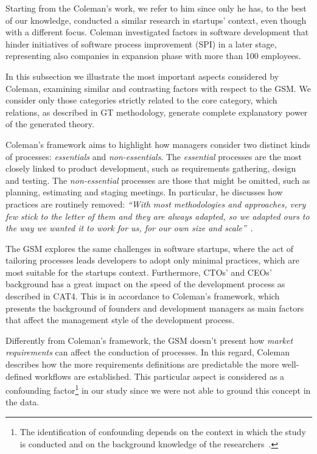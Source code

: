 \documentclass[10pt,journal,letterpaper,compsoc]{IEEEtran}
\begin{document}
Starting from the Coleman's work, we refer to him since only he has, to the
best of our knowledge, conducted a similar research in startups' context, even
though with a different focus. Coleman investigated factors in software
development that hinder initiatives of software process improvement (SPI) in a
later stage, representing also companies in expansion phase with more than 100
employees. %

In this subsection we illustrate the most important aspects considered by
Coleman, examining similar and contrasting factors with respect to the GSM. We
consider only those categories strictly related to the core category, which
relations, as described in GT methodology, generate complete explanatory power
of the generated theory.

Coleman's framework aims to highlight how managers consider two distinct kinds
of processes: \textit{essentials} and \textit{non-essentials}. The
\textit{essential} processes are the most closely linked to product development,
such as requirements gathering, design and testing. The \textit{non-essential}
processes are those that might be omitted, such as planning, estimating and
staging meetings. In particular, he discusses how practices are routinely
removed: \textit{``With most methodologies and approaches, very few stick to the
letter of them and they are always adapted, so we adapted ours to the way we
wanted it to work for us, for our own size and scale''}~\cite{Coleman2008}.

The GSM explores the same challenges in software startups, where the act of
tailoring processes leads developers to adopt only minimal practices, which are
most suitable for the startups context. Furthermore, CTOs' and CEOs' background
has a great impact on the speed of the development process as described in CAT4.
This is in accordance to Coleman's framework, which presents the background of
founders and development managers as main factors that affect the management
style of the development process.

Differently from Coleman's framework, the GSM doesn't present how
\textit{market requirements} can affect the conduction of processes. In this
regard, Coleman describes how the more requirements definitions are predictable
the more well-defined workflows are established. This particular aspect is
considered as a confounding factor\footnote{The identification of confounding
depends on the context in which the study is conducted and on the background
knowledge of the researchers~\cite{Pearl2011}.} in our study since we were not
able to ground this concept in the data.
\end{document}
